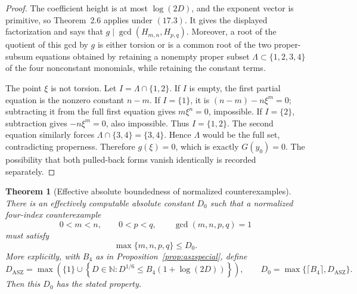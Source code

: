 \documentclass[11pt]{article}
\newtheorem{theorem}{Theorem}[section]
\theoremstyle{definition}
\begin{document}
\begin{proof}
The coefficient height is at most \(\log(2D)\), and the exponent vector is
primitive, so Theorem~2.6 applies under \((17.3)\).  It gives the displayed
factorization and says that \(g\mid\gcd(H_{m,n},H_{p,q})\).  Moreover, a
root of the quotient of this gcd by \(g\) is either torsion or is a common
root of the two proper-subsum equations obtained by retaining a nonempty
proper subset \(\Lambda\subset\{1,2,3,4\}\) of the four nonconstant
monomials, while retaining the constant terms.

The point \(\xi\) is not torsion.  Let
\(I=\Lambda\cap\{1,2\}\).  If \(I\) is empty, the first partial equation
is the nonzero constant \(n-m\).  If \(I=\{1\}\), it is
\((n-m)-n\xi^m=0\); subtracting it from the full first equation gives
\(m\xi^n=0\), impossible.  If \(I=\{2\}\), subtraction gives
\(-n\xi^m=0\), also impossible.  Thus \(I=\{1,2\}\).  The second
equation similarly forces
\(\Lambda\cap\{3,4\}=\{3,4\}\).  Hence \(\Lambda\) would be the full
set, contradicting properness.  Therefore \(g(\xi)=0\), which is exactly
\(G(y_0)=0\).  The possibility that both pulled-back forms vanish
identically is recorded separately.
\end{proof}

\begin{theorem}[Effective absolute boundedness of normalized counterexamples]
\label{thm:hyperplane}
There is an effectively computable absolute constant \(D_0\) such that a
normalized four-index counterexample
\[
 0<m<n,\qquad0<p<q,\qquad\gcd(m,n,p,q)=1
\]
must satisfy
\[
 \max\{m,n,p,q\}\leq D_0.
\]
More explicitly, with \(B_4\) as in
Proposition~\ref{prop:aszspecial}, define
\begin{equation}
 D_{\mathrm{ASZ}}=
 \max\!\left(
 \{1\}\cup
 \left\{D\in\mathbb N:
 D^{1/6}\leq B_4(1+\log(2D))\right\}
 \right),
 \qquad
 D_0=\max\{\lceil B_4\rceil,D_{\mathrm{ASZ}}\}.
 \tag{17.4}
\end{equation}
Then this \(D_0\) has the stated property.
\end{theorem}
\end{document}
